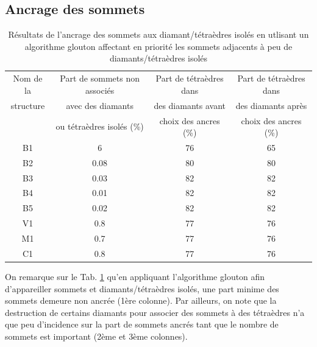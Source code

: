 \subsection{Ancrage des sommets}
\begin{table}[H]
\footnotesize
\centering
\begin{tabular}{|c | c | c | c |}
\hline
Nom de la & Part de sommets non associés & Part de tétraèdres dans  & Part de tétraèdres dans \\
structure&avec des diamants  & des diamants avant & des diamants après \\
& ou tétraèdres isolés (\%) & choix des ancres (\%)& choix des ancres (\%)\\
\hline
B1 & 6 & 76& 65 \\
B2 & 0.08& 80 & 80 \\
B3 & 0.03& 82 & 82\\
B4 & 0.01 & 82 & 82\\
B5 & 0.02 & 82 & 82\\
V1 & 0.8  & 77 & 76 \\
M1 & 0.7 & 77& 76\\
C1 & 0.8 & 77 & 76 \\
\hline  
\end{tabular}
\caption{Résultats de l'ancrage des sommets aux diamant/tétraèdres isolés en utlisant un algorithme glouton affectant en priorité les sommets adjacents à peu de diamants/tétraèdres isolés}
\label{tab:results_ancres}
\end{table}
\noindent
On remarque sur le Tab. \ref{tab:results_ancres} qu'en appliquant l'algorithme glouton afin d'appareiller sommets et diamants/tétraèdres isolés, une part minime des sommets demeure non ancrée (1ère colonne). Par ailleurs, on note que la destruction de certains diamants pour associer des sommets à des tétraèdres n'a que peu d'incidence sur la part de sommets ancrés tant que le nombre de sommets est important (2ème et 3ème colonnes).

\newpage
